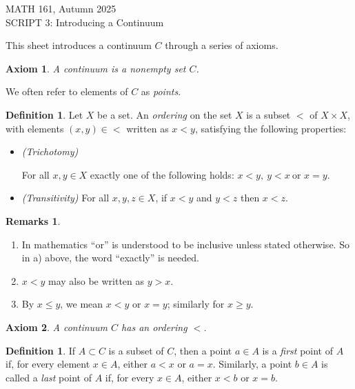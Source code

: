 \documentclass[11pt]{article}
\renewcommand{\_}[1]{\underline{ #1 }}
\newcommand{\head}[1]{
	\begin{center}
		{\large #1}
		\vspace{.2 in}
	\end{center}
	
	\bigskip 
}
\newtheorem{axiom}{Axiom}
\theoremstyle{definition}
\newtheorem{definition}[theorem]{Definition}
\newtheorem{remarks}[theorem]{Remarks}
\numberwithin{equation}{subsection}
\begin{document}
\head{MATH 161, Autumn 2025\\  SCRIPT 3: Introducing a Continuum }




This sheet introduces a continuum $C$ through a series of axioms.


\setcounter{section}{3}   

\begin{axiom} A continuum is a nonempty set $C$.  
\end{axiom}

We often refer to elements of $C$ as \emph{points}.


\begin{definition}  Let $X$ be a set.  An \emph{ordering} on the set $X$ is a subset $<$ of $X \times X$, with elements $(x, y) \in <$ written as $x < y$, satisfying the following properties:

\begin{itemize}
\item[(a)] {\it (Trichotomy) }

For all $x, y \in X$ exactly one of the following holds:
 $x < y,\  y < x\   \text{or } x=y.$ 
\item[(b)] {\it (Transitivity)} For all $x, y, z \in X$, if $x < y$ and $y < z$ then $x < z$.
\end{itemize}
\end{definition}


\begin{remarks}
\begin{enumerate}
\item[a)]  In mathematics ``or'' is understood to be inclusive unless stated otherwise. So in a) above, the word ``exactly'' is needed.
\item[b)] $x<y$ may also be written as $y>x.$
\item[c)] By $x \leq y$, we mean $x < y$ or $x = y$;  similarly for $x \geq y$.
\end{enumerate}
\end{remarks}


\begin{axiom}  A continuum $C$ has an ordering $<$.
\end{axiom}



\begin{definition}  If $A \subset C$ is a subset of $C$, then a point $a \in A$ is a \emph{first} point of $A$ if, for every element $x \in A$, either $a < x$ or $a = x$.  Similarly, a point $b \in A$ is called a \emph{last} point of $A$ if, for every $x \in A$, either $x < b$ or $x = b$.
\end{definition}
\end{document}
